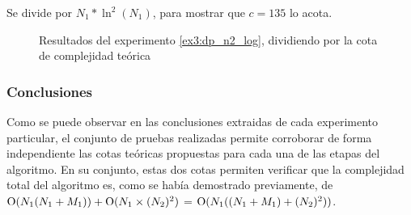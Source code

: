 Se divide por $N_1 * \ln^2(N_1)$, para mostrar que $c = 135$ lo acota.

\begin{figure}[H]
    \centering
    \caption{Resultados del experimento \ref{ex3:dp_n2_log},
    dividiendo por la cota de complejidad teórica}
    \label{fig:exp3:var-nym-base}
\end{figure}

\subsubsection{Conclusiones}

Como se puede observar en las conclusiones extraidas de cada experimento
particular, el conjunto de pruebas realizadas permite corroborar de forma
independiente las cotas teóricas propuestas para cada una de las etapas del
algoritmo. En su conjunto, estas dos cotas permiten verificar que la
complejidad total del algoritmo es, como se había demostrado previamente, de
$\operatorname{O}(N_1(N_1 + M_1)) + \operatorname{O}(N_1 \times (N_2)^2 )$ = $\operatorname{O}(N_1((N_1 + M_1)
+ (N_2)^2))$.
